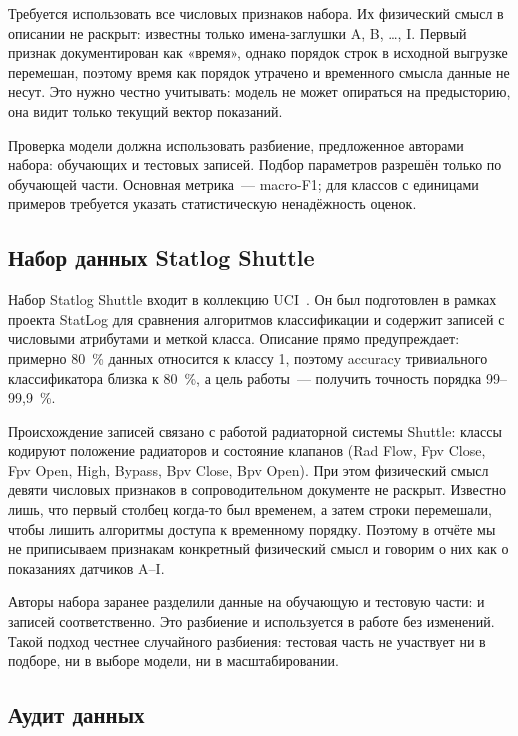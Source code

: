 \documentclass[14pt,a4paper]{extarticle}
\begin{document}
Требуется использовать все \NFeatures{} числовых признаков набора. Их
физический смысл в описании не раскрыт: известны только имена-заглушки
A, B, \ldots, I. Первый признак документирован как «время», однако порядок
строк в исходной выгрузке перемешан, поэтому время как порядок утрачено
и временного смысла данные не несут. Это нужно честно учитывать: модель
не может опираться на предысторию, она видит только текущий вектор
показаний.

Проверка модели должна использовать разбиение, предложенное авторами
набора: \NTrain{} обучающих и \NTest{} тестовых записей. Подбор параметров
разрешён только по обучающей части. Основная метрика~--- macro-F1; для
классов с единицами примеров требуется указать статистическую
ненадёжность оценок.

\subsection{Набор данных Statlog Shuttle}

Набор Statlog Shuttle входит в коллекцию UCI~\cite{shuttle}. Он был
подготовлен в рамках проекта StatLog для сравнения алгоритмов
классификации и содержит \NTotal{} записей с \NFeatures{} числовыми
атрибутами и меткой класса. Описание прямо предупреждает: примерно 80~\%
данных относится к классу 1, поэтому accuracy тривиального
классификатора близка к 80~\%, а цель работы~--- получить точность
порядка 99--99,9~\%.

Происхождение записей связано с работой радиаторной системы Shuttle:
классы кодируют положение радиаторов и состояние клапанов (Rad Flow,
Fpv Close, Fpv Open, High, Bypass, Bpv Close, Bpv Open). При этом
физический смысл девяти числовых признаков в сопроводительном документе
не раскрыт. Известно лишь, что первый столбец когда-то был временем,
а затем строки перемешали, чтобы лишить алгоритмы доступа к временному
порядку. Поэтому в отчёте мы не приписываем признакам конкретный
физический смысл и говорим о них как о показаниях датчиков A--I.

Авторы набора заранее разделили данные на обучающую и тестовую части:
\NTrain{} и \NTest{} записей соответственно. Это разбиение и используется
в работе без изменений. Такой подход честнее случайного разбиения:
тестовая часть не участвует ни в подборе, ни в выборе модели, ни
в масштабировании.

\subsection{Аудит данных}
\end{document}
